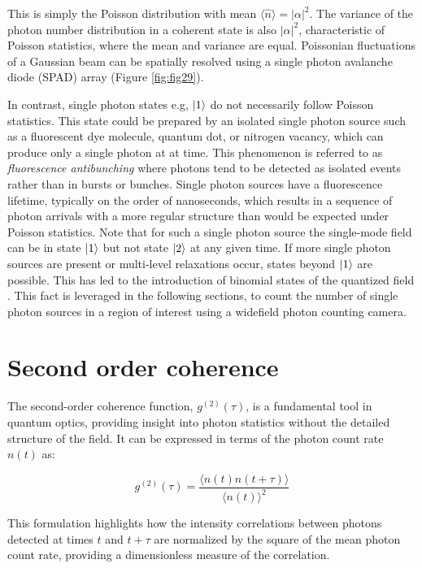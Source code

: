 This is simply the Poisson distribution with mean $\langle \hat{n} \rangle = \lvert\alpha\lvert^2$. The variance of the photon number distribution in a coherent state is also $\lvert\alpha\lvert^2$, characteristic of Poisson statistics, where the mean and variance are equal. Poissonian fluctuations of a Gaussian beam can be spatially resolved using a single photon avalanche diode (SPAD) array (Figure \ref{fig:fig29}).

In contrast, single photon states e.g, $\ket{1}$ do not necessarily follow Poisson statistics. This state could be prepared by an isolated single photon source such as a fluorescent dye molecule, quantum dot, or nitrogen vacancy, which can produce only a single photon at at time. This phenomenon is referred to as \emph{fluorescence antibunching} where photons tend to be detected as isolated events rather than in bursts or bunches. Single photon sources have a fluorescence lifetime, typically on the order of nanoseconds, which results in a sequence of photon arrivals with a more regular structure than would be expected under Poisson statistics. Note that for such a single photon source the single-mode field can be in state $\ket{1}$ but not state $\ket{2}$ at any given time. If more single photon sources are present or multi-level relaxations occur, states beyond $\ket{1}$ are possible. This has led to the introduction of binomial states of the quantized field \parencite{Stoler1985}. This fact is leveraged in the following sections, to count the number of single photon sources in a region of interest using a widefield photon counting camera.

\section{Second order coherence}

The second-order coherence function, $ g^{(2)}(\tau) $, is a fundamental tool in quantum optics, providing insight into photon statistics without the detailed structure of the field. It can be expressed in terms of the photon count rate $ n(t) $ as:

\begin{equation}
g^{(2)}(\tau) = \frac{\langle n(t) n(t+\tau) \rangle}{\langle n(t) \rangle^2}
\end{equation}

This formulation highlights how the intensity correlations between photons detected at times $ t $ and $ t+\tau $ are normalized by the square of the mean photon count rate, providing a dimensionless measure of the correlation.

